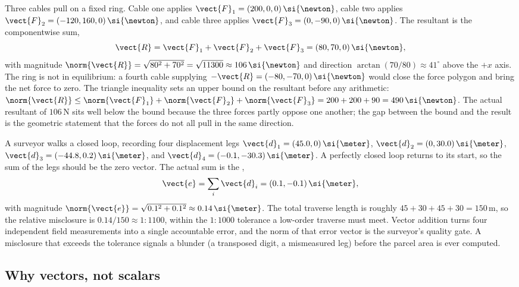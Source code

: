 \begin{example}
Three cables pull on a fixed ring. Cable one applies
$\vect{F}_{1} = (200, 0, 0)\,\si{\newton}$, cable two applies
$\vect{F}_{2} = (-120, 160, 0)\,\si{\newton}$, and cable three applies
$\vect{F}_{3} = (0, -90, 0)\,\si{\newton}$. The resultant is the
componentwise sum,
\[
\vect{R} = \vect{F}_{1} + \vect{F}_{2} + \vect{F}_{3} =
(80, 70, 0)\,\si{\newton},
\]
with magnitude $\norm{\vect{R}} = \sqrt{80^{2} + 70^{2}} =
\sqrt{11300} \approx 106\,\si{\newton}$ and direction
$\arctan(70/80) \approx 41^{\circ}$ above the $+x$ axis. The ring is
not in equilibrium: a fourth cable supplying $-\vect{R} =
(-80, -70, 0)\,\si{\newton}$ would close the force polygon and bring
the net force to zero. The triangle inequality sets an upper bound on
the resultant before any arithmetic: $\norm{\vect{R}} \leq
\norm{\vect{F}_{1}} + \norm{\vect{F}_{2}} + \norm{\vect{F}_{3}} =
200 + 200 + 90 = 490\,\si{\newton}$. The actual resultant of
$106\,\si{\newton}$ sits well below the bound because the three
forces partly oppose one another; the gap between the bound and the
result is the geometric statement that the forces do not all pull in
the same direction.
\end{example}

\begin{example}
A surveyor walks a closed loop, recording four displacement legs
$\vect{d}_{1} = (45.0, 0)\,\si{\meter}$, $\vect{d}_{2} = (0, 30.0)\,
\si{\meter}$, $\vect{d}_{3} = (-44.8, 0.2)\,\si{\meter}$, and
$\vect{d}_{4} = (-0.1, -30.3)\,\si{\meter}$. A perfectly closed loop
returns to its start, so the sum of the legs should be the zero
vector. The actual sum is the ,
\[
\vect{e} = \sum_{i} \vect{d}_{i} = (0.1, -0.1)\,\si{\meter},
\]
with magnitude $\norm{\vect{e}} = \sqrt{0.1^{2} + 0.1^{2}} \approx
0.14\,\si{\meter}$. The total traverse length is roughly
$45 + 30 + 45 + 30 = 150\,\si{\meter}$, so the relative misclosure is
$0.14/150 \approx 1{:}1100$, within the $1{:}1000$ tolerance a
low-order traverse must meet. Vector addition turns four independent
field measurements into a single accountable error, and the norm of
that error vector is the surveyor's quality gate. A misclosure that
exceeds the tolerance signals a blunder (a transposed digit, a
mismeasured leg) before the parcel area is ever computed.
\end{example}

\subsection{Why vectors, not scalars}

